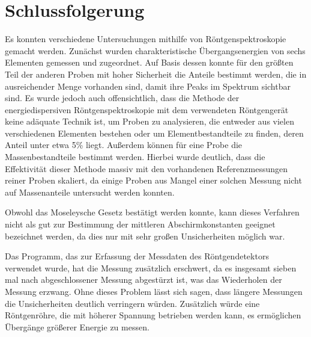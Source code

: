 \documentclass[
	a4paper,
	12pt,
	pagesize,
	ngerman
]{scrartcl}
\begin{document}
	\section{Schlussfolgerung}
	Es konnten verschiedene Untersuchungen mithilfe von Röntgenspektroskopie gemacht werden.
	Zunächst wurden charakteristische Übergangsenergien von sechs Elementen gemessen und zugeordnet.
	Auf Basis dessen konnte für den größten Teil der anderen Proben mit hoher Sicherheit die Anteile bestimmt werden, die in ausreichender Menge vorhanden sind, damit ihre Peaks im Spektrum sichtbar sind.
	Es wurde jedoch auch offensichtlich, dass die Methode der energiedispersiven Röntgenspektroskopie mit dem verwendeten Röntgengerät keine adäquate Technik ist, um Proben zu analysieren, die entweder aus vielen verschiedenen Elementen bestehen oder um Elementbestandteile zu finden, deren Anteil unter etwa 5\% liegt. %
	Außerdem können für eine Probe die Massenbestandteile bestimmt werden.
	Hierbei wurde deutlich, dass die Effektivität dieser Methode massiv mit den vorhandenen Referenzmessungen reiner Proben skaliert, da einige Proben aus Mangel einer solchen Messung nicht auf Massenanteile untersucht werden konnten.
	
	Obwohl das Moseleysche Gesetz bestätigt werden konnte, kann dieses Verfahren nicht als gut zur Bestimmung der mittleren Abschirmkonstanten geeignet bezeichnet werden, da dies nur mit sehr großen Unsicherheiten möglich war.
	
	Das Programm, das zur Erfassung der Messdaten des Röntgendetektors verwendet wurde, hat die Messung zusätzlich erschwert, da es insgesamt sieben mal nach abgeschlossener Messung abgestürzt ist, was das Wiederholen der Messung erzwang. Ohne dieses Problem lässt sich sagen, dass längere Messungen die Unsicherheiten deutlich verringern würden.
	Zusätzlich würde eine Röntgenröhre, die mit höherer Spannung betrieben werden kann, es ermöglichen Übergänge größerer Energie zu messen.
	
	
	
	\printbibliography
\end{document}
